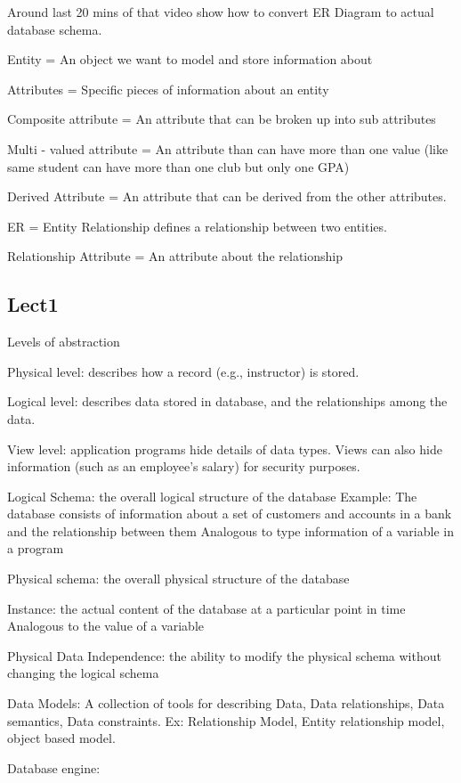 \documentclass[8pt, a4paper, oneside, twocolumn]{extarticle}
\begin{document}
Around last 20 mins of that video show how to convert ER Diagram to actual database schema.

Entity = An object we want to model and store information about

Attributes = Specific pieces of information about an entity

Composite attribute = An attribute that can be broken up into sub attributes

Multi - valued attribute = An attribute than can have more than one value (like same student can have more than one club but only one GPA)

Derived Attribute = An attribute that can be derived from the other attributes.

ER = Entity Relationship defines a relationship between two entities.

Relationship Attribute = An attribute about the relationship

\subsection{Lect1}
Levels of abstraction

Physical level: describes how a record (e.g., instructor) is stored.

Logical level: describes data stored in database, and the relationships among 
the data.

View level: application programs hide details of data types.  Views can also 
hide information (such as an employee’s salary) for security purposes. 

Logical Schema: the overall logical structure of the database 
Example: The database consists of information about a set of customers and 
accounts in a bank and the relationship between them
Analogous to type information of a variable in a program

Physical schema: the overall physical structure of the database 

Instance: the actual content of the database at a particular point in time 
Analogous to the value of a variable

Physical Data Independence: the ability to modify the physical schema without 
changing the logical schema

Data Models: A collection of tools for describing Data, Data relationships, Data semantics, Data constraints. Ex: Relationship Model, Entity relationship model, object based model.

Database engine: 
\end{document}
